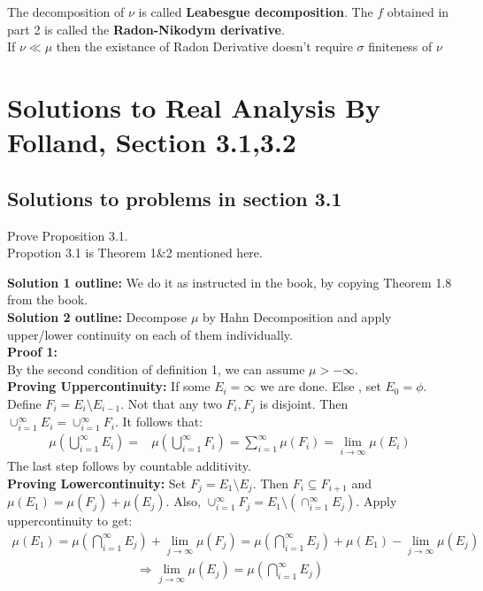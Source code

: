 \documentclass[notoc]{tufte-book}
\begin{document}
The decomposition of $\nu$ is called \textbf{Leabesgue decomposition}. The $f$ obtained in part 2 is called the \textbf{Radon-Nikodym derivative}.\\
If $\nu\ll\mu$ then the existance of Radon Derivative doesn't require $\sigma$ finiteness of $\nu$

\section{Solutions to Real Analysis By Folland, Section 3.1,3.2}
\subsection{Solutions to problems in section 3.1}
\begin{tcolorbox}[colback=c4,colframe=c3,title=Problem 3.1]
	Prove Proposition 3.1.\\\noindent
	{Propotion 3.1} is Theorem 1\&2 mentioned here.
\end{tcolorbox}\noindent
\textbf{Solution 1 outline:} We do it as instructed in the book, by copying Theorem 1.8 from the book.\\
\textbf{Solution 2 outline:} Decompose $\mu$ by Hahn Decomposition and apply upper/lower continuity on each of them  individually.\\
\textbf{Proof 1:}\\\noindent
By the second condition of definition 1, we can assume $\mu>-\infty$.\\ 
\noindent \textbf{Proving Uppercontinuity:} If some $E_i=\infty$ we are done. Else , set $E_0=\phi$. Define $F_i=E_i\setminus E_{i-1}$. Not that any two $F_i,F_j$ is disjoint. Then $\cup_{i=1}^\infty E_i= \cup_{i=1}^\infty F_i$. It follows that:
\begin{align*}
	\mu\left(\bigcup_{i=1}^\infty E_i\right)=&\mu\left(\bigcup_{i=1}^\infty F_i\right)
	=\sum_{i=1}^\infty \mu\left(F_i\right)=\lim_{i\to\infty}\mu(E_i)
\end{align*}
The last step follows by countable additivity.\\\noindent
\noindent \textbf{Proving Lowercontinuity:}
Set $F_j=E_1\setminus E_j$. Then $F_i\subseteq F_{i+1}$ and $\mu(E_1)=\mu(F_j)+\mu(E_j)$. Also, $\cup_{i=1}^\infty F_j=E_1\setminus(\cap_{i=1}^\infty E_j)$. Apply uppercontinuity to get: 
\begin{align*}
	\mu(E_1)=\mu\left(\bigcap_{i=1}^\infty E_j\right)+\lim_{j\to\infty}\mu(F_j)=\mu\left(\bigcap_{i=1}^\infty E_j\right)+\mu(E_1)-\lim_{j\to\infty}\mu(E_j)
\end{align*}
\begin{align*}
	\Rightarrow \lim_{j\to\infty}\mu(E_j)=\mu\left(\bigcap_{i=1}^\infty E_j\right)
\end{align*}
\end{document}
